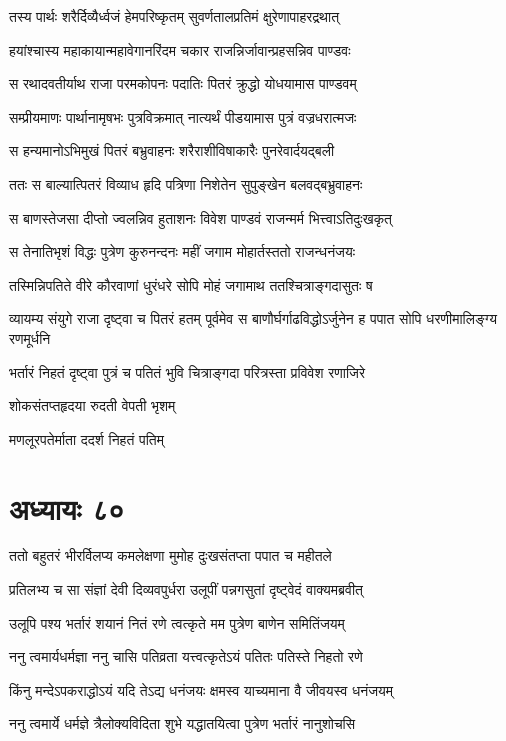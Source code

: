 \twolineshloka
{तस्य पार्थः शरैर्दिव्यैर्ध्वजं हेमपरिष्कृतम्}
{सुवर्णतालप्रतिमं क्षुरेणापाहरद्रथात्}


\twolineshloka
{हयांश्चास्य महाकायान्महावेगानरिंदम}
{चकार राजन्निर्जावान्प्रहसन्निव पाण्डवः}


\twolineshloka
{स रथादवतीर्याथ राजा परमकोपनः}
{पदातिः पितरं क्रुद्धो योधयामास पाण्डवम्}


\twolineshloka
{सम्प्रीयमाणः पार्थानामृषभः पुत्रविक्रमात्}
{नात्यर्थं पीडयामास पुत्रं वज्रधरात्मजः}


\twolineshloka
{स हन्यमानोऽभिमुखं पितरं बभ्रुवाहनः}
{शरैराशीविषाकारैः पुनरेवार्दयद्बली}


\twolineshloka
{ततः स बाल्यात्पितरं विव्याध हृदि पत्रिणा}
{निशेतेन सुपुङ्खेन बलवद्बभ्रुवाहनः}


\twolineshloka
{स बाणस्तेजसा दीप्तो ज्वलन्निव हुताशनः}
{विवेश पाण्डवं राजन्मर्म भित्त्वाऽतिदुःखकृत्}


\twolineshloka
{स तेनातिभृशं विद्धः पुत्रेण कुरुनन्दनः}
{महीं जगाम मोहार्तस्ततो राजन्धनंजयः}


\threelineshloka
{तस्मिन्निपतिते वीरे कौरवाणां धुरंधरे}
{सोपि मोहं जगामाथ ततश्चित्राङ्गदासुतः}
{ष}


\threelineshloka
{व्यायम्य संयुगे राजा दृष्ट्वा च पितरं हतम्}
{पूर्वमेव स बाणौर्घर्गाढविद्धोऽर्जुनेन ह}
{पपात सोपि धरणीमालिङ्ग्य रणमूर्धनि}


\twolineshloka
{भर्तारं निहतं दृष्ट्वा पुत्रं च पतितं भुवि}
{चित्राङ्गदा परित्रस्ता प्रविवेश रणाजिरे}


\twolineshloka
{शोकसंतप्तहृदया रुदती वेपती भृशम्}
{}


मणलूरपतेर्माता ददर्श निहतं पतिम्
\chapter{अध्यायः ८०}
\twolineshloka
{ततो बहुतरं भीरर्विलप्य कमलेक्षणा}
{मुमोह दुःखसंतप्ता पपात च महीतले}


\twolineshloka
{प्रतिलभ्य च सा संज्ञां देवी दिव्यवपुर्धरा}
{उलूपीं पन्नगसुतां दृष्ट्वेदं वाक्यमब्रवीत्}


\twolineshloka
{उलूपि पश्य भर्तारं शयानं नितं रणे}
{त्वत्कृते मम पुत्रेण बाणेन समितिंजयम्}


\twolineshloka
{ननु त्वमार्यधर्मज्ञा ननु चासि पतिव्रता}
{यत्त्वत्कृतेऽयं पतितः पतिस्ते निहतो रणे}


\twolineshloka
{किंनु मन्देऽपकराद्धोऽयं यदि तेऽद्य धनंजयः}
{क्षमस्व याच्यमाना वै जीवयस्व धनंजयम्}


\twolineshloka
{ननु त्वमार्ये धर्मज्ञे त्रैलोक्यविदिता शुभे}
{यद्धातयित्वा पुत्रेण भर्तारं नानुशोचसि}


